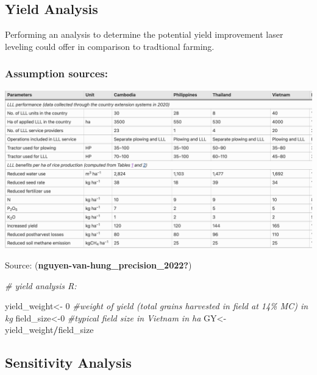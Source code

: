 \documentclass[
]{article}
\newenvironment{Shaded}{\begin{snugshade}}{\end{snugshade}}
\newcommand{\CommentTok}[1]{\textcolor[rgb]{0.56,0.35,0.01}{\textit{#1}}}
\newcommand{\DecValTok}[1]{\textcolor[rgb]{0.00,0.00,0.81}{#1}}
\newcommand{\NormalTok}[1]{#1}
\newcommand{\OtherTok}[1]{\textcolor[rgb]{0.56,0.35,0.01}{#1}}
\newcommand{\SpecialCharTok}[1]{\textcolor[rgb]{0.81,0.36,0.00}{\textbf{#1}}}
\begin{document}
\hypertarget{yield-analysis}{%
\subsection{Yield Analysis}\label{yield-analysis}}

Performing an analysis to determine the potential yield improvement
laser leveling could offer in comparison to tradtional farming.

\hypertarget{assumption-sources}{%
\subsubsection{Assumption sources:}\label{assumption-sources}}

\includegraphics{images/Screenshot 2023-06-12 at 9.38.09 PM.png}

Source: (\textbf{nguyen-van-hung\_precision\_2022?})

\begin{Shaded}
\begin{Highlighting}[]
\CommentTok{\# yield analysis R:}

\NormalTok{yield\_weight}\OtherTok{\textless{}{-}} \DecValTok{0} \CommentTok{\#weight of yield (total grains harvested in field at 14\% MC) in kg}
\NormalTok{field\_size}\OtherTok{\textless{}{-}}\DecValTok{0}  \CommentTok{\#typical field size in Vietnam in ha}
\NormalTok{GY}\OtherTok{\textless{}{-}}\NormalTok{ yield\_weight}\SpecialCharTok{/}\NormalTok{field\_size}
\end{Highlighting}
\end{Shaded}

\hypertarget{sensitivity-analysis}{%
\subsection{Sensitivity Analysis}\label{sensitivity-analysis}}
\end{document}

